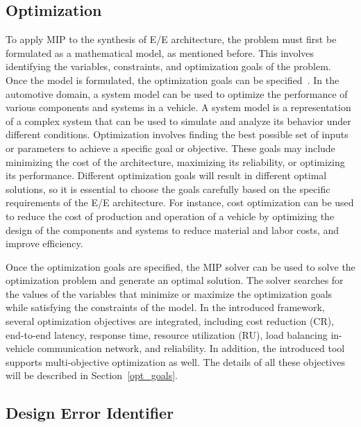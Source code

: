     \subsection{Optimization}
    To apply MIP to the synthesis of E/E architecture, the problem must first be formulated as a mathematical model, as mentioned before. This involves identifying the variables, constraints, and optimization goals of the problem.
    Once the model is formulated, the optimization goals can be specified~\cite{9565115,9613692}.
    In the automotive domain, a system model can be used to optimize the performance of various components and systems in a vehicle. A system model is a representation of a complex system that can be used to simulate and analyze its behavior under different conditions. Optimization involves finding the best possible set of inputs or parameters to achieve a specific goal or objective.
    These goals may include minimizing the cost of the architecture, maximizing its reliability, or optimizing its performance. Different optimization goals will result in different optimal solutions, so it is essential to choose the goals carefully based on the specific requirements of the E/E architecture. For instance, cost optimization can be used to reduce the cost of production and operation of a vehicle by optimizing the design of the components and systems to reduce material and labor costs, and improve efficiency.
    
    Once the optimization goals are specified, the MIP solver can be used to solve the optimization problem and generate an optimal solution. The solver searches for the values of the variables that minimize or maximize the optimization goals while satisfying the constraints of the model. In the introduced framework, several optimization objectives are integrated, including cost reduction (CR), end-to-end latency, response time, resource utilization (RU), load balancing in-vehicle communication network, and reliability. In addition, the introduced tool supports multi-objective optimization as well. The details of all these objectives will be described in Section~\ref{opt_goals}.


    \subsection{Design Error Identifier}
    
